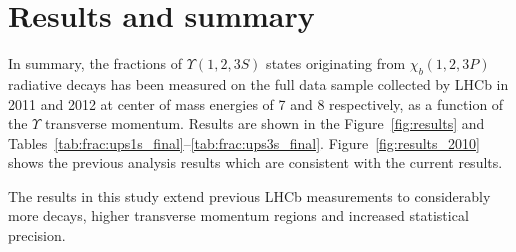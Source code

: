 \section{Results and summary}
\label{sec:results}

In summary, the fractions of $\Upsilon(1,2,3S)$ states originating from $\chi_b(1,2,3P)$ 
radiative decays has been measured on the full data sample collected by LHCb in 2011 and 2012 
at center of mass energies of 7 and 8 \tev respectively, as a function of the $\Upsilon$ 
transverse momentum. Results are shown in the Figure~\ref{fig:results} and 
Tables~\ref{tab:frac:ups1s_final}--\ref{tab:frac:ups3s_final}.
Figure~\ref{fig:results_2010} shows the previous analysis results which
are consistent with the current results.






The results in this study extend previous LHCb measurements to considerably
more decays, higher transverse momentum regions and increased statistical
precision.

